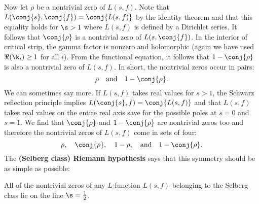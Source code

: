     Now let $\rho$ be a nontrivial zero of $L(s,f)$. Note that $L(\conj{s},\conj{f}) = \conj{L(s,f)}$ by the identity theorem and that this equality holds for $\s > 1$ where $L(s,f)$ is defined by a Dirichlet series. It follows that $\conj{\rho}$ is a nontrivial zero of $L(s,\conj{f})$. In the interior of critical strip, the gamma factor is nonzero and holomorphic (again we have used $\Re(\k_{i}) \ge 1$ for all $i$). From the functional equation, it follows that $1-\conj{\rho}$ is also a nontrivial zero of $L(s,f)$. In short, the nontrivial zeros occur in pairs:
    \[
      \rho \quad \text{and} \quad 1-\conj{\rho}.
    \]
    We can sometimes say more. If $L(s,f)$ takes real values for $s > 1$, the Schwarz reflection principle implies $L(\conj{s},f) = \conj{L(s,f)}$ and that $L(s,f)$ takes real values on the entire real axis save for the possible poles at $s = 0$ and $ s = 1$. We find that $\conj{\rho}$ and $1-\conj{\rho}$ are nontrivial zeros too and therefore the nontrivial zeros of $L(s,f)$ come in sets of four:
    \[
      \rho, \quad \conj{\rho}, \quad 1-\rho, \quad \text{and} \quad 1-\conj{\rho}.
    \]
    The \textbf{(Selberg class) Riemann hypothesis} says that this symmetry should be as simple as possible:

    \begin{conjecture}
      All of the nontrivial zeros of any $L$-function $L(s,f)$ belonging to the Selberg class lie on the line $\s = \frac{1}{2}$.
    \end{conjecture}
